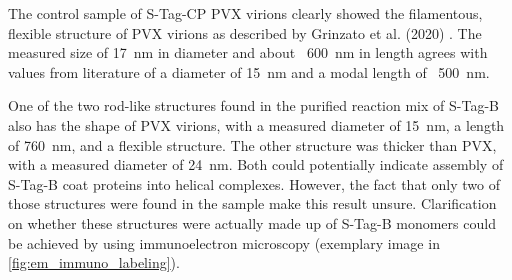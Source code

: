 The control sample of S-Tag-CP PVX virions clearly showed the filamentous, flexible structure of PVX virions as described by Grinzato et al. (2020) \cite{Grinzato2020}. The measured size of \SI{17}{\nano\meter} in diameter and about ~\SI{600}{\nano\meter} in length agrees with values from literature of a diameter of \SI{15}{\nano\meter} and a modal length of ~\SI{500}{\nano\meter}. 

One of the two rod-like structures found in the purified reaction mix of S-Tag-B also has the shape of PVX virions, with a measured diameter of \SI{15}{\nano\meter}, a length of \SI{760}{\nano\meter}, and a flexible structure. The other structure was thicker than PVX, with a measured diameter of \SI{24}{\nano\meter}. Both could potentially indicate assembly of S-Tag-B coat proteins into helical complexes. However, the fact that only two of those structures were found in the sample make this result unsure. Clarification on whether these structures were actually made up of S-Tag-B monomers could be achieved by using immunoelectron microscopy (exemplary image in \autoref{fig:em_immuno_labeling}).

